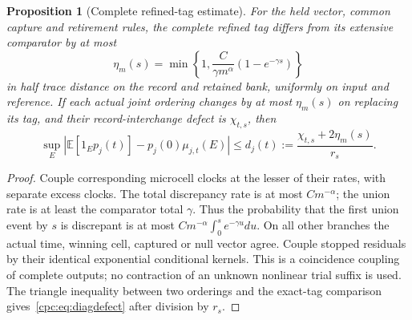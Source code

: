 \documentclass[11pt,oneside,openany]{book}
\newtheorem{proposition}[theorem]{Proposition}
\theoremstyle{definition}
\theoremstyle{remark}\newtheorem{remark}[theorem]{Remark}
\begin{document}
\begin{proposition}[Complete refined-tag estimate]
\label{cpc:prop:tagerror}
For the held vector, common capture and retirement rules, the complete refined tag differs from its extensive comparator by at most
\begin{equation}
 \eta_m(s)=\min\left\{1,\frac{C}{\gamma m^\alpha}(1-e^{-\gamma s})\right\}
 \label{cpc:eq:tagerror}
\end{equation}
in half trace distance on the record and retained bank, uniformly on input and reference. If each actual joint ordering changes by at most $\eta_m(s)$ on replacing its tag, and their record-interchange defect is $\chi_{t,s}$, then
\begin{equation}
 \sup_E\left|\mathbb E[1_Ep_j(t)]-p_j(0)\mu_{j,t}(E)\right|
 \le d_j(t):=\frac{\chi_{t,s}+2\eta_m(s)}{r_s}.
 \label{cpc:eq:diagdefect}
\end{equation}
\end{proposition}
\begin{proof}
Couple corresponding microcell clocks at the lesser of their rates, with separate excess clocks. The total discrepancy rate is at most $Cm^{-\alpha}$; the union rate is at least the comparator total $\gamma$. Thus the probability that the first union event by $s$ is discrepant is at most $Cm^{-\alpha}\int_0^se^{-\gamma u}du$. On all other branches the actual time, winning cell, captured or null vector agree. Couple stopped residuals by their identical exponential conditional kernels. This is a coincidence coupling of complete outputs; no contraction of an unknown nonlinear trial suffix is used. The triangle inequality between two orderings and the exact-tag comparison gives~\eqref{cpc:eq:diagdefect} after division by $r_s$.
\end{proof}
\end{document}
